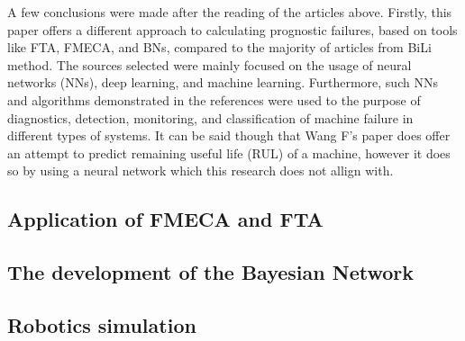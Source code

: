 A few conclusions were made after the reading of the articles above. Firstly, this paper offers a different approach to calculating prognostic failures, based on tools like FTA, FMECA, and BNs, compared to the majority of articles from BiLi method. The sources selected were mainly focused on the usage of neural networks (NNs), deep learning, and machine learning. Furthermore, such NNs and algorithms demonstrated in the references were used to the purpose of diagnostics, detection, monitoring, and classification of machine failure in different types of systems. It can be said though that Wang F's paper \cite{YANG201927} does offer an attempt to predict remaining useful life (RUL) of a machine, however it does so by using a neural network which this research does not allign with.

\subsection{Application of FMECA and FTA}

\subsection{The development of the Bayesian Network}

\subsection{Robotics simulation}



